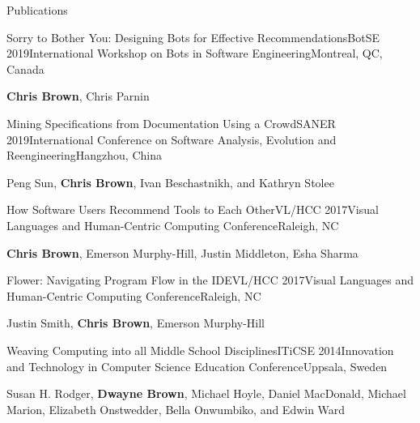 \documentclass{resume} %
\begin{document}
\begin{rSection}{Publications}


\begin{rSubsection}{Sorry to Bother You: Designing Bots for Effective Recommendations}{BotSE 2019}{International Workshop on Bots in Software Engineering}{Montreal, QC, Canada}
\item \textbf{Chris Brown}, Chris Parnin
\end{rSubsection}


\begin{rSubsection}{Mining Specifications from Documentation Using a Crowd}{SANER 2019}{International Conference on Software Analysis, Evolution and Reengineering}{Hangzhou, China}
\item Peng Sun, \textbf{Chris Brown}, Ivan Beschastnikh, and Kathryn Stolee
\end{rSubsection}


\begin{rSubsection}{How Software Users Recommend Tools to Each Other}{VL/HCC 2017}{Visual Languages and Human-Centric Computing Conference}{Raleigh, NC}
\item \textbf{Chris Brown}, Emerson Murphy-Hill, Justin Middleton, Esha Sharma
\end{rSubsection}


\begin{rSubsection}{Flower: Navigating Program Flow in the IDE}{VL/HCC 2017}{Visual Languages and Human-Centric Computing Conference}{Raleigh, NC}
\item Justin Smith, \textbf{Chris Brown}, Emerson Murphy-Hill
\end{rSubsection}


\begin{rSubsection}{Weaving Computing into all Middle School Disciplines}{ITiCSE 2014}{Innovation and Technology in Computer Science Education Conference}{Uppsala, Sweden}
\item Susan H. Rodger, \textbf{Dwayne Brown}, Michael Hoyle, Daniel MacDonald, Michael Marion, Elizabeth Onstwedder, Bella Onwumbiko, and Edwin Ward
\end{rSubsection}

\end{rSection}
\end{document}
